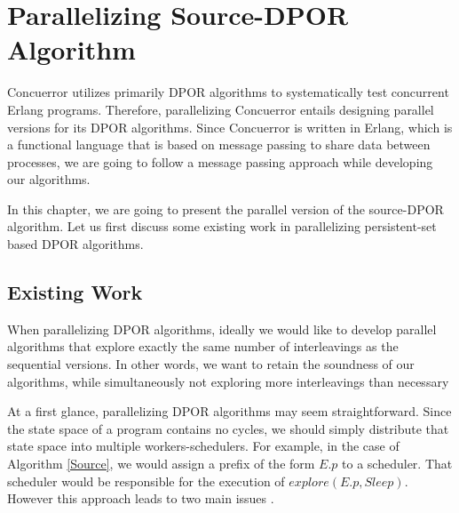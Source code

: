 \chapter{Parallelizing Source-DPOR Algorithm}
\label{paradpor}

Concuerror utilizes primarily DPOR algorithms to systematically test concurrent Erlang programs. 
Therefore, parallelizing Concuerror entails designing parallel versions for its DPOR algorithms. 
Since Concuerror is written in Erlang, which is a functional language that is based on message passing to share 
data between processes, we are going to follow a message passing approach while developing our algorithms.

In this chapter, we are going to present the parallel version of the source-DPOR algorithm. Let us first
discuss some existing work in parallelizing persistent-set based DPOR algorithms.

\section{Existing Work}

When parallelizing DPOR algorithms, ideally we would like to develop parallel algorithms that explore
exactly the same number of interleavings as the sequential versions. In other words, we want to retain
the soundness of our algorithms, while simultaneously not exploring more interleavings than necessary

At a first glance, parallelizing DPOR algorithms may seem straightforward. Since the state space of a program contains no cycles, 
we should simply distribute that state space into multiple workers-schedulers. For example, in the case of Algorithm \ref{Source}, 
we would assign a prefix of the form $E.p$ to a scheduler. That scheduler would be responsible for the execution of $explore(E.p, Sleep)$.
However this approach leads to two main issues \cite{Yang:2007:DDP:1770532.1770541}.

